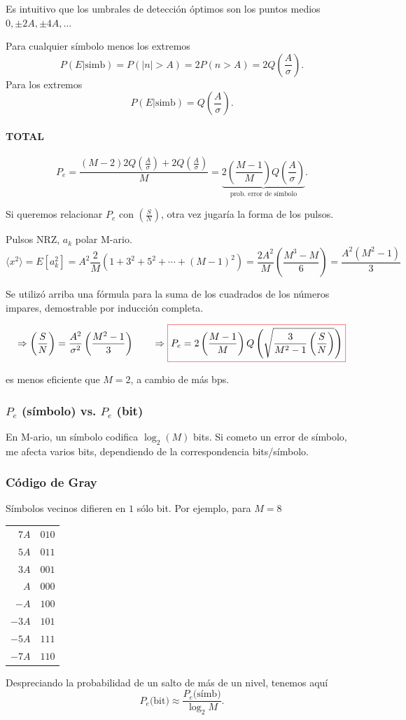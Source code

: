Es intuitivo que los umbrales de detección óptimos son los puntos medios $0,\pm 2A, \pm 4A,\ldots$

Para cualquier símbolo menos los extremos
\[P(E|\text{simb}) = P(|n|>A) = 2P(n>A) = 2Q\left(\frac{A}{\sigma}\right).\]
Para los extremos
\[P(E|\text{simb}) = Q\left(\frac{A}{\sigma}\right).\]

\paragraph{TOTAL}

\[P_e=\frac{(M-2) 2 Q\left(\frac{A}{\sigma}\right) + 2Q\left(\frac{A}{\sigma}\right)}{M} = \underbrace{2\left(\frac{M-1}{M}\right)Q\left(\frac{A}{\sigma}\right)}_{\text{prob. error de símbolo}}.\]

Si queremos relacionar $P_e$ con $\left(\frac{S}{N}\right)$, otra
vez jugaría la forma de los pulsos.

\begin{ejemplo}
    Pulsos NRZ, $a_k$ polar M-ario.
    \[\langle x^2\rangle=E[a_k^2]=A^2\frac{2}{M}\left(1+3^2+5^2+\cdots+(M-1)^2\right) = \frac{2A^2}{M}\left(\frac{M^3-M}{6}\right) = \frac{A^2(M^2-1)}{3}\]

  Se utilizó arriba una fórmula para la suma de los cuadrados de los números
  impares, demostrable por inducción completa.

\[\Rightarrow \left(\frac{S}{N}\right)=\frac{A^2}{\sigma^2}\left(\frac{M^2-1}{3}\right) \qquad
\Rightarrow
{\col{P_e=2\left(\frac{M-1}{M}\right)Q\left(\sqrt{\frac{3}{M^2-1}\left(\frac{S}{N}\right)}\right)}}\]

    es menos eficiente que $M=2$, a cambio de más bps.
\end{ejemplo}

\subsubsection*{$P_e$ (símbolo) vs. $P_e$ (bit)}

En M-ario, un símbolo codifica $\log_2(M)$ bits. Si cometo un error de símbolo, me afecta varios bits, dependiendo de la correspondencia bits/símbolo.

\subsubsection*{Código de Gray} Símbolos vecinos difieren en $1$ sólo bit. Por ejemplo, para $M=8$

\begin{tabular}{r|r}
    $7A$ & $010$\\
    $5A$ & $011$\\
    $3A$ & $001$\\
    $A$  & $000$\\
    \hline
    $-A$ & $100$\\
    $-3A$ & $101$\\
    $-5A$ & $111$\\
    $-7A$ & $110$
\end{tabular} Despreciando la probabilidad de un salto de más de un nivel, tenemos aquí
\[P_e\text{(bit)} \approx \frac{P_e\text{(símb)}}{\log_2 M}.\]

